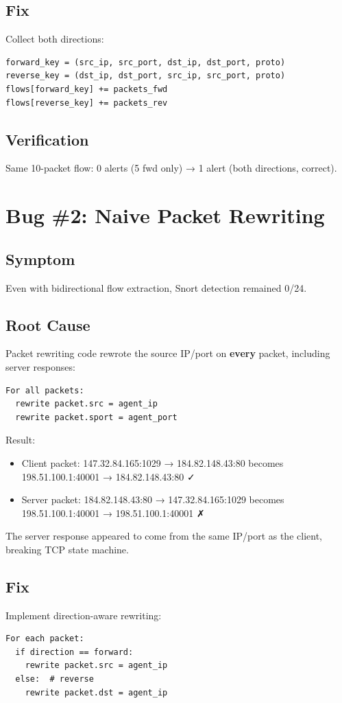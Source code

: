 \documentclass[12pt,a4paper]{report}
\begin{document}
\subsection{Fix}
Collect both directions:
\begin{verbatim}
forward_key = (src_ip, src_port, dst_ip, dst_port, proto)
reverse_key = (dst_ip, dst_port, src_ip, src_port, proto)
flows[forward_key] += packets_fwd
flows[reverse_key] += packets_rev
\end{verbatim}

\subsection{Verification}
Same 10-packet flow: 0 alerts (5 fwd only) → 1 alert (both directions, correct).

\section{Bug \#2: Naive Packet Rewriting}

\subsection{Symptom}
Even with bidirectional flow extraction, Snort detection remained 0/24.

\subsection{Root Cause}
Packet rewriting code rewrote the source IP/port on \textbf{every} packet, including server responses:
\begin{verbatim}
For all packets:
  rewrite packet.src = agent_ip
  rewrite packet.sport = agent_port
\end{verbatim}

Result:
\begin{itemize}
  \item Client packet: 147.32.84.165:1029 → 184.82.148.43:80 becomes 198.51.100.1:40001 → 184.82.148.43:80 ✓
  \item Server packet: 184.82.148.43:80 → 147.32.84.165:1029 becomes 198.51.100.1:40001 → 198.51.100.1:40001 ✗
\end{itemize}

The server response appeared to come from the same IP/port as the client, breaking TCP state machine.

\subsection{Fix}
Implement direction-aware rewriting:
\begin{verbatim}
For each packet:
  if direction == forward:
    rewrite packet.src = agent_ip
  else:  # reverse
    rewrite packet.dst = agent_ip
\end{verbatim}
\end{document}
